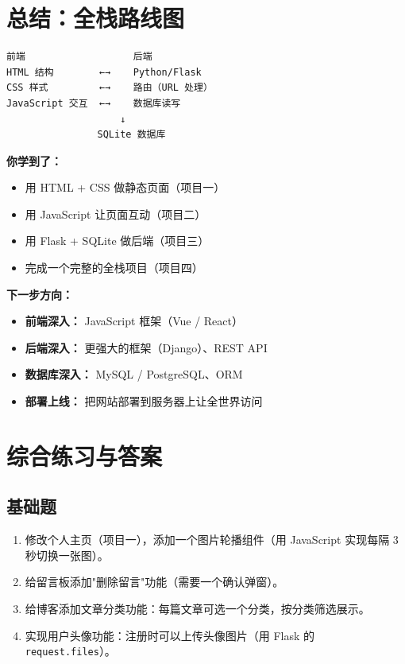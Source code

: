 \documentclass[a4paper,12pt]{ctexart}
\begin{document}
\section*{总结：全栈路线图}

\begin{verbatim}
前端                   后端
HTML 结构        ←→    Python/Flask
CSS 样式         ←→    路由（URL 处理）
JavaScript 交互  ←→    数据库读写
                    ↓
                SQLite 数据库
\end{verbatim}

\textbf{你学到了：}
\begin{itemize}
  \item 用 HTML + CSS 做静态页面（项目一）
  \item 用 JavaScript 让页面互动（项目二）
  \item 用 Flask + SQLite 做后端（项目三）
  \item 完成一个完整的全栈项目（项目四）
\end{itemize}

\textbf{下一步方向：}
\begin{itemize}
  \item \textbf{前端深入：} JavaScript 框架（Vue / React）
  \item \textbf{后端深入：} 更强大的框架（Django）、REST API
  \item \textbf{数据库深入：} MySQL / PostgreSQL、ORM
  \item \textbf{部署上线：} 把网站部署到服务器上让全世界访问
\end{itemize}

\section*{综合练习与答案}

\subsection*{基础题}

\begin{enumerate}
  \item 修改个人主页（项目一），添加一个图片轮播组件（用 JavaScript 实现每隔 3 秒切换一张图）。
  \item 给留言板添加"删除留言"功能（需要一个确认弹窗）。
  \item 给博客添加文章分类功能：每篇文章可选一个分类，按分类筛选展示。
  \item 实现用户头像功能：注册时可以上传头像图片（用 Flask 的 \texttt{request.files}）。
\end{enumerate}
\end{document}
